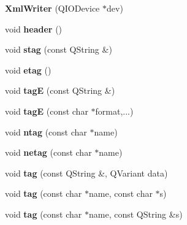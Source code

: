 \begin{DoxyCompactItemize}
\item 
\mbox{\label{class_xml_writer_a3ae3a8d1e9142ef3b17b7fe9af38c1c8}} 
{\bfseries Xml\+Writer} (Q\+I\+O\+Device $\ast$dev)
\item 
\mbox{\label{class_xml_writer_afe67913ce00000b0e09b1223eef161b8}} 
void {\bfseries header} ()
\item 
\mbox{\label{class_xml_writer_ae0325cf8d1fc68e75ad12d447f7babcd}} 
void {\bfseries stag} (const Q\+String \&)
\item 
\mbox{\label{class_xml_writer_a1002621a3dc238212f19d2e345ca3a72}} 
void {\bfseries etag} ()
\item 
\mbox{\label{class_xml_writer_aeef558c426437cf25fc276c6a17b1732}} 
void {\bfseries tagE} (const Q\+String \&)
\item 
\mbox{\label{class_xml_writer_afed2aa3b240cfdc461ec2181bd0533e4}} 
void {\bfseries tagE} (const char $\ast$format,...)
\item 
\mbox{\label{class_xml_writer_ab186b744386262c7312d662c010ce188}} 
void {\bfseries ntag} (const char $\ast$name)
\item 
\mbox{\label{class_xml_writer_aa88bb0b31eda2948dbc69ad87246eaa4}} 
void {\bfseries netag} (const char $\ast$name)
\item 
\mbox{\label{class_xml_writer_a554858cc813cf53774fd4b482dffb4bc}} 
void {\bfseries tag} (const Q\+String \&, Q\+Variant data)
\item 
\mbox{\label{class_xml_writer_ac4dc9ef4f66c0b6134ede91d237f74ee}} 
void {\bfseries tag} (const char $\ast$name, const char $\ast$s)
\item 
\mbox{\label{class_xml_writer_a715075ca6da02def088b4a858bff69f7}} 
void {\bfseries tag} (const char $\ast$name, const Q\+String \&s)
\end{DoxyCompactItemize}
